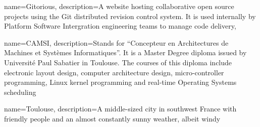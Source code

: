 {
  name=Gitorious,
  description={A website hosting collaborative open source projects
    using the Git distributed revision control system. It is used
    internally by Platform Software Intergration engineering teams to
    manage code delivery},
}




{
  name=CAMSI,
  description={Stands for ``Concepteur en Architectures de Machines et
    Systèmes Informatiques''. It is a Master Degree diploma
    issued by Université Paul Sabatier in Toulouse. The courses of this
    diploma include electronic layout design, computer architecture design,
    micro-controller programming, Linux kernel programming and
    real-time Operating Systems scheduling}
}


{
  name=Toulouse,
  description={A middle-sized city in southwest France with friendly
    people and an almost constantly sunny weather, albeit windy}
}


